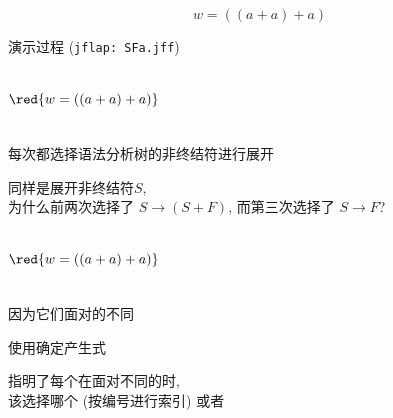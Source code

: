 \begin{frame}{}
  \begin{center}
    
    \[
      w = ((a + a) + a)
    \]
  \end{center}
\end{frame}

\begin{frame}{}
  \begin{center}
    演示过程 (\texttt{jflap: SFa.jff})

    \begin{columns}
        

        \vspace{-0.80cm}
        \[
          \red{w = ((a + a) + a)}
        \]
    \end{columns}

    \pause
    \vspace{0.30cm}
    每次都选择语法分析树的非终结符进行展开
  \end{center}
\end{frame}

\begin{frame}{}
  \begin{center}
    同样是展开非终结符$S$, \\[4pt]
    为什么前两次选择了 $S \to (S + F)$, 而第三次选择了 $S \to F$?

    \begin{columns}
        

        \vspace{-0.80cm}
        \[
          \red{w = ((a + a) + a)}
        \]
    \end{columns}

    \pause
    \vspace{0.50cm}
    因为它们面对的不同
  \end{center}
\end{frame}

\begin{frame}{}
  \begin{center}
    {\large 使用确定产生式}
    

    
    指明了每个在面对不同的时, \\[4pt]
    该选择哪个 (按编号进行索引) 或者
  \end{center}
\end{frame}

